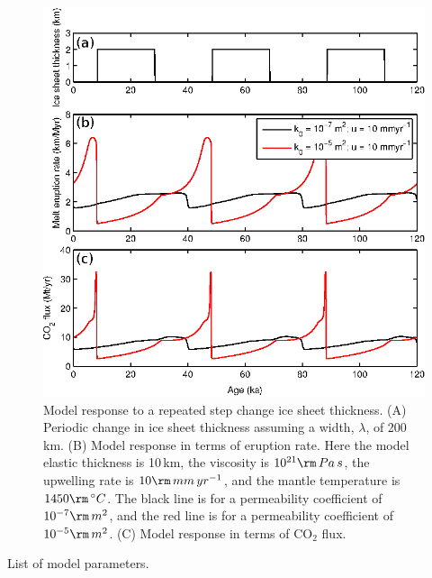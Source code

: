 \documentclass[draft,grl]{agutexSI2018}
\begin{document}
\begin{figure}
\includegraphics{../figures/version05/supp-figure5.eps}
\caption{Model response to a repeated step change ice sheet thickness. (A) Periodic change in ice sheet thickness assuming a width, $\lambda$, of 200\,km. (B) Model response in terms of eruption rate. Here the model elastic thickness is 10\,km, the viscosity is $10^{21}\rm\,Pa\,s$, the upwelling rate is $10\rm\,mm\,yr^{-1}$, and the mantle temperature is $1450\rm\,^{\circ}C$. The black line is for a permeability coefficient of $10^{-7}\rm\,m^{2}$, and the red line is for a permeability coefficient of $10^{-5}\rm\,m^{2}$. (C) Model response in terms of CO$_{2}$ flux.}
\label{fg:S3}
\end{figure}

%
%
\begin{table}
\caption{List of model parameters.}
\end{table}
\end{document}
